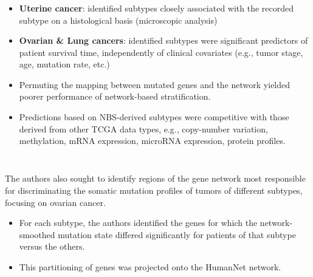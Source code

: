 \begin{frame}[fragile] \frametitle{}
    \begin{itemize}
        \item \textbf{Uterine cancer}: identified subtypes closely associated
            with the recorded subtype on a histological basis (microscopic
            analysis)
        \item \textbf{Ovarian \& Lung cancers}: identified subtypes were
            significant predictors of patient survival time, independently of
            clinical covariates (e.g., tumor stage, age, mutation rate, etc.)
        \item Permuting the mapping between mutated genes and the network
            yielded poorer performance of network-based stratification.
        \item Predictions based on NBS-derived subtypes were competitive
            with those derived from other TCGA data types, e.g., copy-number
            variation, methylation, mRNA expression, microRNA expression,
            protein profiles.
    \end{itemize}
\end{frame}
\begin{frame}[fragile] \frametitle{}
    \\ \vspace{0.5cm}
    The authors also sought to identify regions of the gene network most
    responsible for discriminating the somatic mutation profiles of tumors
    of different subtypes, focusing on ovarian cancer.
    \begin{itemize}
        \item For each subtype, the authors identified the genes for which the
            network-smoothed mutation state differed significantly for patients
            of that subtype versus the others.
        \item This partitioning of genes was projected onto the HumanNet network.
    \end{itemize}
\end{frame}
